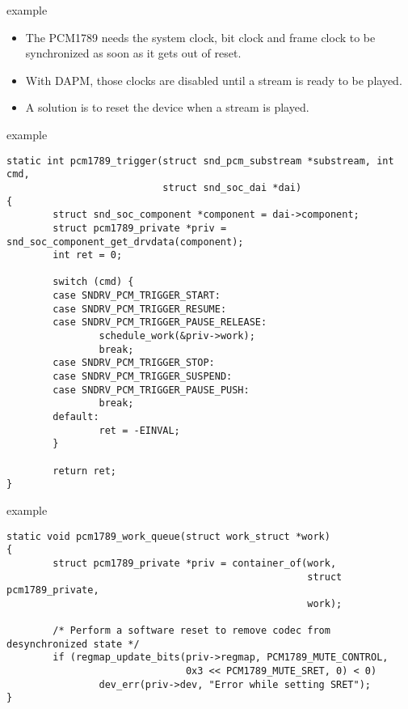 \begin{frame}{ example}
  \begin{itemize}
  \item The PCM1789 needs the system clock, bit clock and frame clock
    to be synchronized as soon as it gets out of reset.
  \item With DAPM, those clocks are disabled until a stream is ready
    to be played.
  \item A solution is to reset the device when a stream is played.
  \end{itemize}
\end{frame}

\begin{frame}[fragile]{ example}
  \begin{block}{}
    \fontsize{8}{8}\selectfont
    \begin{verbatim}
static int pcm1789_trigger(struct snd_pcm_substream *substream, int cmd,
                           struct snd_soc_dai *dai)
{
        struct snd_soc_component *component = dai->component;
        struct pcm1789_private *priv = snd_soc_component_get_drvdata(component);
        int ret = 0;

        switch (cmd) {
        case SNDRV_PCM_TRIGGER_START:
        case SNDRV_PCM_TRIGGER_RESUME:
        case SNDRV_PCM_TRIGGER_PAUSE_RELEASE:
                schedule_work(&priv->work);
                break;
        case SNDRV_PCM_TRIGGER_STOP:
        case SNDRV_PCM_TRIGGER_SUSPEND:
        case SNDRV_PCM_TRIGGER_PAUSE_PUSH:
                break;
        default:
                ret = -EINVAL;
        }

        return ret;
}
    \end{verbatim}
  \end{block}
\end{frame}

\begin{frame}[fragile]{ example}
  \begin{block}{}
    \fontsize{8}{8}\selectfont
    \begin{verbatim}
static void pcm1789_work_queue(struct work_struct *work)
{
        struct pcm1789_private *priv = container_of(work,
                                                    struct pcm1789_private,
                                                    work);

        /* Perform a software reset to remove codec from desynchronized state */
        if (regmap_update_bits(priv->regmap, PCM1789_MUTE_CONTROL,
                               0x3 << PCM1789_MUTE_SRET, 0) < 0)
                dev_err(priv->dev, "Error while setting SRET");
}
    \end{verbatim}
  \end{block}
\end{frame}

